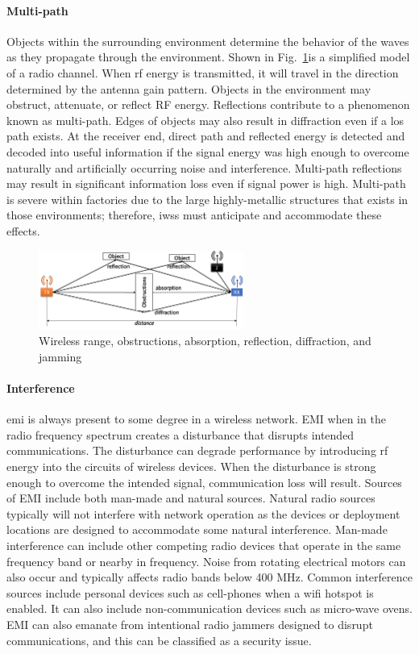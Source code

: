 \paragraph{Multi-path} Objects within the surrounding environment determine the behavior of the waves as they propagate through the environment.  Shown in Fig.~\ref{intro:fig:multipath}is a simplified model of a radio channel. When \gls{rf} energy is transmitted, it will travel in the direction determined by the antenna gain pattern.  Objects in the environment may obstruct, attenuate, or reflect RF energy.  Reflections contribute to a phenomenon known as multi-path.   Edges of objects may also result in diffraction even if a \gls{los} path exists.  At the receiver end, direct path and reflected energy is detected and decoded into useful information if the signal energy was high enough to overcome naturally and artificially occurring noise and interference.  Multi-path reflections may result in significant information loss even if signal power is high.  Multi-path is severe within factories due to the large highly-metallic structures that exists in those environments\cite{Candell2017.NIST1951,Rappaport1991,Remley2008}; therefore, \glspl{iws} must anticipate and accommodate these effects.

\begin{figure}
	\centering
	\includegraphics[width=0.6\textwidth]{chapter-intro/images/multipath}
	\caption{Wireless range, obstructions, absorption, reflection, diffraction, and jamming}
	\label{intro:fig:multipath}
\end{figure}

\paragraph{Interference} \Gls{emi} is always present to some degree in a wireless network.  EMI when in the radio frequency spectrum creates a disturbance that disrupts intended communications.  The disturbance can degrade performance by introducing \gls{rf} energy into the circuits of wireless devices.  When the disturbance is strong enough to overcome the intended signal, communication loss will result.  Sources of EMI include both man-made and natural sources.  Natural radio sources typically will not interfere with network operation as the devices or deployment locations are designed to accommodate some natural interference.  Man-made interference can include other competing radio devices that operate in the same frequency band or nearby in frequency.  Noise from rotating electrical motors can also occur and typically affects radio bands below 400 MHz.  Common interference sources include personal devices such as cell-phones when a \gls{wifi} hotspot is enabled.  It can also include non-communication devices such as micro-wave ovens.  EMI can also emanate from intentional radio jammers designed to disrupt communications, and this can be classified as a security issue.

